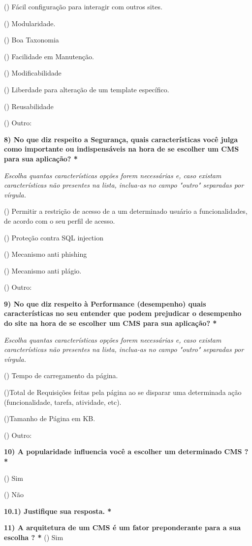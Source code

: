 \begin{apendicesenv}
() Fácil configuração para interagir com outros sites.

() Modularidade.

() Boa Taxonomia

() Facilidade em Manutenção.

() Modificabilidade

() Liberdade para alteração de um template específico.

() Reusabilidade

() Outro: 


\textbf{8) No que diz respeito a Segurança, quais características você julga como importante ou indispensáveis na hora de se escolher um CMS para sua aplicação? *}

\textit{Escolha quantas características opções forem necessárias e, caso existam características não presentes na lista, inclua-as no campo "outro" separadas por vírgula.}

() Permitir a restrição de  acesso de a um determinado usuário a funcionalidades, de acordo com o seu perfil de acesso.
  
() Proteção contra SQL injection

() Mecanismo anti phishing

() Mecanismo anti plágio.

() Outro:
 
\textbf{9) No que diz respeito à Performance (desempenho) quais características no seu entender que podem prejudicar o desempenho do site na hora de se escolher um CMS para sua aplicação? *}

\textit{Escolha quantas características opções forem necessárias e, caso existam características não presentes na lista, inclua-as no campo "outro" separadas por vírgula.}

 () Tempo de carregamento da página.
 
 ()Total de Requisições feitas pela página ao se disparar uma determinada ação (funcionalidade, tarefa, atividade, etc).
 
 ()Tamanho de Página em KB.
 
() Outro: 

\textbf{10) A popularidade influencia você a escolher um determinado CMS ? *
}

()  Sim
  
() Não
 
\textbf{10.1) Justifique sua resposta. *}
 
\textbf{11) A arquitetura de um CMS é um fator preponderante para a sua escolha ? *}
 () Sim
 

\end{apendicesenv}
